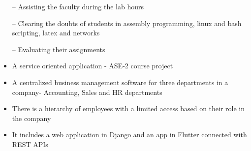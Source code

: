 \documentclass[10pt,a4paper]{altacv}
\begin{document}
\tagline{}

%

\begin{fullwidth}
\makecvheader
\end{fullwidth}

%





\begin{itemize}
    \setlength{\itemindent}{0.5em}
    \item[--]   \small{Assisting the faculty during the lab hours}
    \item[--]   \small{Clearing the doubts of students in assembly programming, linux and bash scripting, latex and networks}
    \item[--]   \small{Evaluating their assignments}
\end{itemize}

\medskip






\begin{itemize}
  \item \small{A service oriented application - ASE-2 course project }
  \item A centralized business management software for three departments in a company- Accounting, Sales and HR departments
  \item There is a hierarchy of employees with a limited access based on their role in the company 
  \item It includes a web application in Django and an app in Flutter connected with REST APIs
\end{itemize}
\end{document}

